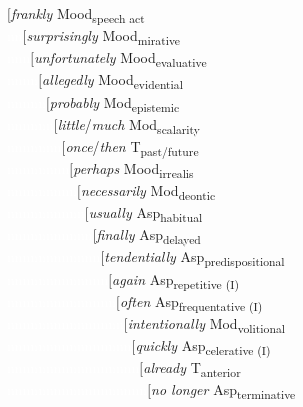 \clearpage
\begin{exe}
\largerpage[2]
\ex\label{bsp:hierarchyone} 
{\small $[$\textit{frankly} Mood\textsubscript{speech act} \\
\textcolor{white}{nn}$[$\textit{surprisingly} Mood\textsubscript{mirative} \\
\textcolor{white}{nnn}$[$\textit{unfortunately} Mood\textsubscript{evaluative} \\
\textcolor{white}{nnnn}$[$\textit{allegedly} Mood\textsubscript{evidential} \\
\textcolor{white}{nnnnn}$[$\textit{probably} Mod\textsubscript{epistemic} \\
\textcolor{white}{nnnnnn}$[$\textit{little}/\textit{much} Mod\textsubscript{scalarity} \\
\textcolor{white}{nnnnnnn}$[$\textit{once}/\textit{then} T\textsubscript{past/future} \\
\textcolor{white}{nnnnnnnn}$[$\textit{perhaps} Mood\textsubscript{irrealis} \\
\textcolor{white}{nnnnnnnnn}$[$\textit{necessarily} Mod\textsubscript{deontic} \\
\textcolor{white}{nnnnnnnnnn}$[$\textit{usually} Asp\textsubscript{habitual} \\
\textcolor{white}{nnnnnnnnnnn}$[$\textit{finally} Asp\textsubscript{delayed} \\
\textcolor{white}{nnnnnnnnnnnn}$[$\textit{tendentially} Asp\textsubscript{predispositional} \\
\textcolor{white}{nnnnnnnnnnnnn}$[$\textit{again} Asp\textsubscript{repetitive (I)} \\
\textcolor{white}{nnnnnnnnnnnnnn}$[$\textit{often} Asp\textsubscript{frequentative (I)} \\
\textcolor{white}{nnnnnnnnnnnnnnn}$[$\textit{intentionally} Mod\textsubscript{volitional} \\
\textcolor{white}{nnnnnnnnnnnnnnnn}$[$\textit{quickly} Asp\textsubscript{celerative (I)} \\
\textcolor{white}{nnnnnnnnnnnnnnnnn}$[$\textit{already} T\textsubscript{anterior} \\
\textcolor{white}{nnnnnnnnnnnnnnnnnn}$[$\textit{no longer} Asp\textsubscript{terminative} \\
}
\end{exe}

